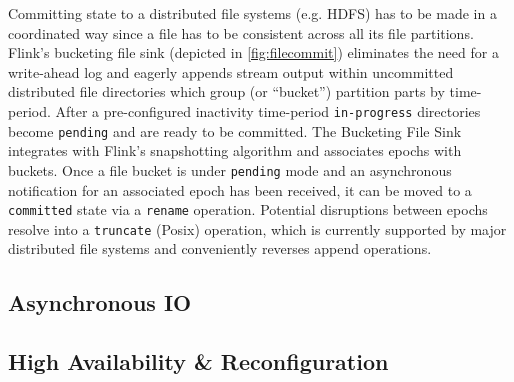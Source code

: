  Committing state to a distributed file systems (e.g. HDFS) has to be made in a coordinated way since a file has to be consistent across all its file partitions. Flink's bucketing file sink (depicted in \autoref{fig:filecommit}) eliminates the need for a write-ahead log and eagerly appends stream output within uncommitted distributed file directories which group (or ``bucket'') partition parts by time-period. After a pre-configured inactivity time-period \texttt{in-progress} directories become \texttt{pending} and are ready to be committed. The Bucketing File Sink integrates with Flink's snapshotting algorithm and associates epochs with buckets. Once a file bucket is under \texttt{pending} mode and an asynchronous notification for an associated epoch has been received, it can be moved to a \texttt{committed} state via a \texttt{rename} operation. Potential disruptions between epochs resolve into a \texttt{truncate} (Posix) operation, which is currently supported by major distributed file systems and conveniently reverses append operations. 

\subsection{Asynchronous IO}

\subsection{High Availability \& Reconfiguration}

	